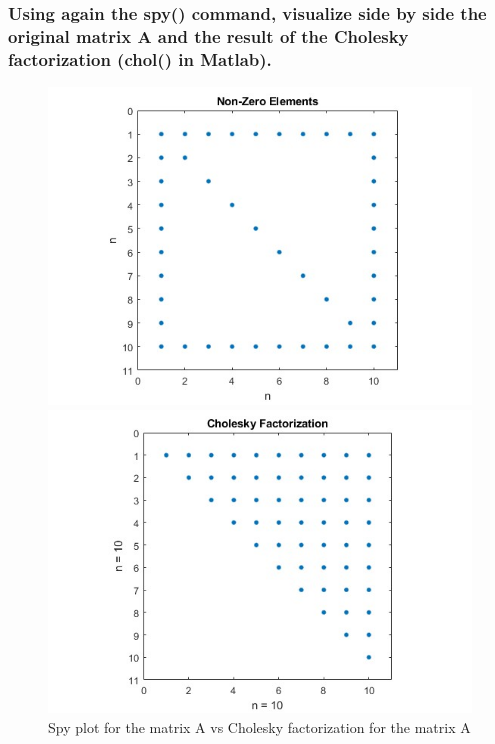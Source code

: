 \documentclass[unicode,11pt,a4paper,oneside,numbers=endperiod,openany]{scrartcl}
\begin{document}
\subsubsection{Using again the spy() command, visualize side by side the original matrix A and the result of the Cholesky factorization (chol() in Matlab).}

\begin{figure}[H]
    \centering
    \begin{minipage}[b]{0.45\textwidth}
        \centering
        \includegraphics[width=\textwidth]{images/nbyn.jpg}
    \end{minipage}
    \hfill
    \begin{minipage}[b]{0.45\textwidth}
        \centering
        \includegraphics[width=\textwidth]{images/chol.jpg}
    \end{minipage}
    \caption{Spy plot for the matrix A vs Cholesky factorization for the matrix A} 
    \label{fig:comparison}
\end{figure}
\end{document}

